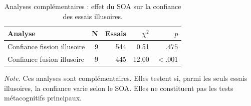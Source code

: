 \begin{table}[ht]
\centering
\caption{Analyses complémentaires : effet du SOA sur la confiance des essais illusoires.}
\label{tab:secondary_illusory_confidence_soa_v2}
\footnotesize
\begin{tabular}{lrrrr}
\toprule
Analyse & N & Essais & $\chi^2$ & $p$ \\
\midrule
Confiance fission illusoire & 9 & 544 & 0.51 & $.475$ \\
Confiance fusion illusoire & 9 & 445 & 12.00 & $< .001$ \\
\bottomrule
\end{tabular}

\vspace{0.2cm}
\begin{minipage}{0.92\textwidth}
\footnotesize
\textit{Note.} Ces analyses sont complémentaires. Elles testent si, parmi les seuls essais illusoires, la confiance varie selon le SOA. Elles ne constituent pas les tests métacognitifs principaux.
\end{minipage}
\end{table}
